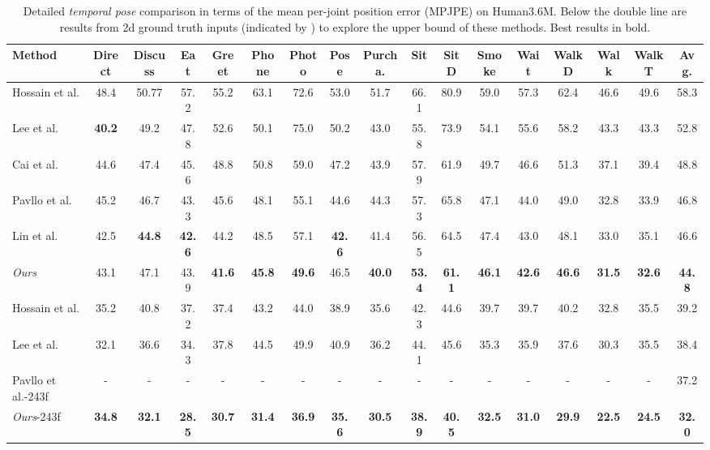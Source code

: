 \documentclass[runningheads]{llncs}
\begin{document}
\begin{table*}
\begin{center}
\resizebox{\textwidth}{20mm}
{
\begin{tabular}{ l c c c c c c c c c c c c c c c c }
\hline
Method & Direct & Discuss & Eat & Greet & Phone& Photo & Pose  & Purcha. & Sit & SitD &Smoke &Wait &WalkD&Walk& WalkT & Avg.\\
\hline
Hossain et al. \cite{rayat2018exploiting} &48.4& 50.77 &57.2 &55.2& 63.1& 72.6 &53.0& 51.7& 66.1& 80.9& 59.0& 57.3&62.4 &46.6& 49.6& 58.3\\
Lee et al. \cite{lee2018propagating} &\textbf{40.2}& 49.2& 47.8& 52.6& 50.1& 75.0& 50.2& 43.0& 55.8 &73.9 &54.1& 55.6& 58.2& 43.3 &43.3& 52.8\\
Cai et al. \cite{cai2019exploiting} &44.6 &47.4& 45.6& 48.8 &50.8 &59.0 &47.2 &43.9& 57.9& 61.9& 49.7& 46.6& 51.3& 37.1& 39.4& 48.8\\
Pavllo et al. \cite{pavllo20193d}&45.2& 46.7& 43.3 &45.6& 48.1& 55.1 &44.6& 44.3& 57.3& 65.8& 47.1& 44.0 &49.0& 32.8& 33.9& 46.8\\
Lin et al. \cite{lin2019trajectory} &42.5 &\textbf{44.8} &\textbf{42.6}& 44.2& 48.5& 57.1 &\textbf{42.6} &41.4 &56.5 &64.5 &47.4& 43.0& 48.1 &33.0& 35.1& 46.6\\
\emph{Ours} &43.1&47.1&43.9&\textbf{41.6}&\textbf{45.8}&\textbf{49.6}&46.5&\textbf{40.0}&\textbf{53.4}&\textbf{61.1}&\textbf{46.1}&\textbf{42.6}&\textbf{46.6}&\textbf{31.5}&\textbf{32.6}&\textbf{44.8}\\
\hline\hline
Hossain et al. \cite{rayat2018exploiting} &35.2 &40.8 &37.2 &37.4 &43.2 &44.0 &38.9& 35.6& 42.3& 44.6& 39.7&39.7& 40.2& 32.8& 35.5& 39.2\\
Lee et al. \cite{lee2018propagating}  &32.1 &36.6& 34.3& 37.8& 44.5& 49.9& 40.9& 36.2& 44.1& 45.6& 35.3& 35.9& 37.6& 30.3& 35.5& 38.4\\
Pavllo et al.-243f \cite{pavllo20193d}  &-&-&-&-&-&-&-&-&-&-&-&-&-&-&-&37.2\\

\emph{Ours}-243f  &\textbf{34.8} & \textbf{32.1} & \textbf{28.5} &\textbf{30.7} & \textbf{31.4} & \textbf{36.9} & \textbf{35.6} & \textbf{30.5} &\textbf{38.9} &\textbf{40.5} &\textbf{32.5} &\textbf{31.0} &\textbf{29.9}&\textbf{22.5}&\textbf{24.5}&\textbf{32.0}\\
\hline
\end{tabular}}
\end{center}
\caption{Detailed \emph{temporal pose} comparison in terms of the mean per-joint position error (MPJPE) on Human3.6M. Below the double line are results from 2d ground truth inputs (indicated by ) to explore the upper bound of these methods. Best results in bold. }
\label{tab:human_p1_temporal}
\end{table*}
\end{document}
